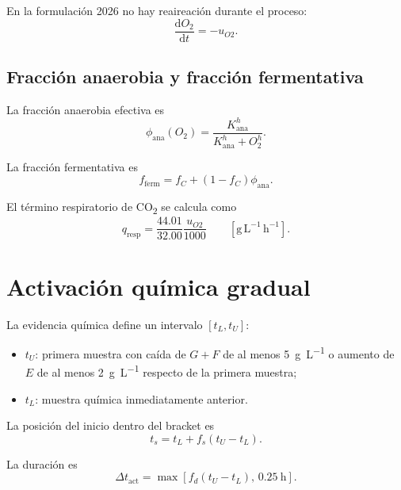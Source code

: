 \documentclass[11pt,a4paper]{article}
\newcommand{\dd}{\mathrm{d}}
\newcommand{\gLh}{\mathrm{g\,L^{-1}\,h^{-1}}}
\begin{document}
En la formulación 2026 no hay reaireación durante el proceso:
\begin{equation}
\boxed{
\frac{\dd O_2}{\dd t}
=
-u_{O2}.
}
\label{eq:o2ode}
\end{equation}

\subsection{Fracción anaerobia y fracción fermentativa}

La fracción anaerobia efectiva es
\begin{equation}
\phi_{\mathrm{ana}}(O_2)
=
\frac{K_{\mathrm{ana}}^h}
{K_{\mathrm{ana}}^h+O_2^h}.
\label{eq:ana}
\end{equation}

La fracción fermentativa es
\begin{equation}
\boxed{
f_{\mathrm{ferm}}
=
f_C+(1-f_C)\phi_{\mathrm{ana}}.
}
\label{eq:ferm_fraction}
\end{equation}

El término respiratorio de CO\textsubscript{2} se calcula como
\begin{equation}
q_{\mathrm{resp}}
=
\frac{44.01}{32.00}
\frac{u_{O2}}{1000}
\qquad [\gLh].
\label{eq:qresp}
\end{equation}

\section{Activación química gradual}

La evidencia química define un intervalo $[t_L,t_U]$:
\begin{itemize}
    \item $t_U$: primera muestra con caída de $G+F$ de al menos \SI{5}{g.L^{-1}}
    o aumento de $E$ de al menos \SI{2}{g.L^{-1}} respecto de la primera muestra;
    \item $t_L$: muestra química inmediatamente anterior.
\end{itemize}

La posición del inicio dentro del bracket es
\begin{equation}
t_s=
t_L+
f_s(t_U-t_L).
\label{eq:ts}
\end{equation}

La duración es
\begin{equation}
\Delta t_{\mathrm{act}}
=
\max\left[
f_d(t_U-t_L),\,
0.25\ \mathrm{h}
\right].
\label{eq:dtact}
\end{equation}
\end{document}
